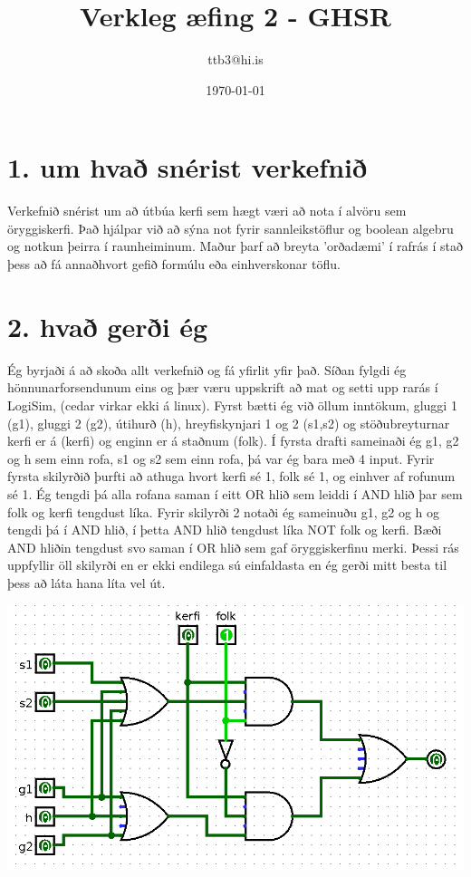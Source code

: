 \documentclass{article}
\title{Verkleg æfing 2 - GHSR}
\author{ttb3@hi.is}
\date{\today}
\begin{document}
\maketitle


\section*{1. um hvað snérist verkefnið}
Verkefnið snérist um að útbúa kerfi sem hægt væri að nota í alvöru sem öryggiskerfi. Það hjálpar við að sýna
not fyrir sannleikstöflur og boolean algebru og notkun þeirra í raunheiminum. Maður þarf að breyta 'orðadæmi'
í rafrás í stað þess að fá annaðhvort gefið formúlu eða einhverskonar töflu.

\section*{2. hvað gerði ég}
Ég byrjaði á að skoða allt verkefnið og fá yfirlit yfir það. Síðan fylgdi ég hönnunarforsendunum eins og þær væru
uppskrift að mat og setti upp rarás í LogiSim, (cedar virkar ekki á linux). 
Fyrst bætti ég við öllum inntökum, gluggi 1 (g1), 
gluggi 2 (g2), útihurð (h), 
hreyfiskynjari 1 og 2 (s1,s2) og stöðubreyturnar kerfi er á (kerfi) og enginn er á staðnum (folk).
Í fyrsta drafti sameinaði ég g1, g2 og h sem einn rofa, s1 og s2 sem einn rofa, þá var ég bara með 4 input.
Fyrir fyrsta skilyrðið þurfti að athuga hvort kerfi sé 1, folk sé 1, og einhver af rofunum sé 1. Ég tengdi þá 
alla rofana saman í eitt OR hlið sem leiddi í AND hlið þar sem folk og kerfi tengdust líka.
Fyrir skilyrði 2 notaði ég sameinuðu g1, g2 og h og tengdi þá í AND hlið, í þetta AND hlið tengdust líka NOT folk og kerfi.
Bæði AND hliðin tengdust svo saman í OR hlið sem gaf öryggiskerfinu merki.
Þessi rás uppfyllir öll skilyrði en er ekki endilega sú einfaldasta en ég gerði mitt besta til þess að láta hana líta vel út.
\begin{center}
    \includegraphics[scale=0.35]{ras.png}
\end{center}
\end{document}
